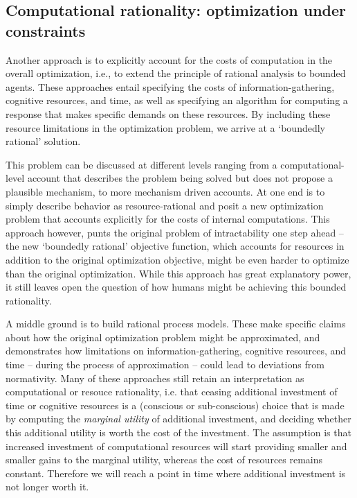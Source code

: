 \subsection{Computational rationality: optimization under constraints}

Another approach is to explicitly account for the costs of computation in the overall optimization, i.e., to extend the principle of rational analysis to bounded agents.
These approaches entail specifying the costs of information-gathering, cognitive resources, and time, as well as specifying an algorithm for computing a response that makes specific demands on these resources. By including these resource limitations in the optimization problem, we arrive at a `boundedly rational' solution.

This problem can be discussed at different levels ranging from a computational-level account that describes the problem being solved but does not propose a plausible mechanism, to more mechanism driven accounts. At one end is to simply describe behavior as resource-rational \citep{Vul2014, schulz2016simple} and posit a new optimization problem that accounts explicitly for the costs of internal computations. This approach however, punts the original problem of intractability one step ahead -- the new `boundedly rational' objective function, which accounts for resources in addition to the original optimization objective, might be even harder to optimize than the original optimization. While this approach has great explanatory power, it still leaves open the question of how humans might be achieving this bounded rationality.

A middle ground is to build rational process models\citep{griffiths2015, sanborn2010rational, dasgupta17}. These make specific claims about how the original optimization problem might be approximated, and demonstrates how limitations on information-gathering, cognitive resources, and time -- during the process of approximation -- could lead to deviations from normativity. Many of these approaches still retain an interpretation as computational or resouce rationality, i.e. that ceasing additional investment of time or cognitive resources is a (conscious or sub-conscious) choice that is made by computing the \textit{marginal utility} of additional investment, and deciding whether this additional utility is worth the cost of the investment\cite{gershman15, griffiths2015}. The assumption is that increased investment of computational resources will start providing smaller and smaller gains to the marginal utility, whereas the cost of resources remains constant. Therefore we will reach a point in time where additional investment is not longer worth it.

